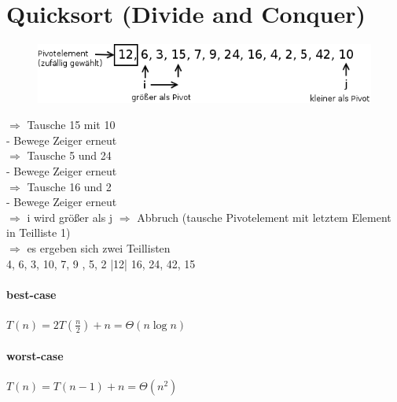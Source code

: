 \section{Quicksort (Divide and Conquer)}

\begin{figure}[h]
\includegraphics[width=0.6\linewidth]{5/Grafik/img1.png}
\end{figure}

$\Rightarrow $ Tausche 15 mit 10 \\
- Bewege Zeiger erneut \\
$\Rightarrow $ Tausche 5 und 24 \\
- Bewege Zeiger erneut \\
$\Rightarrow $ Tausche 16 und 2 \\
- Bewege Zeiger erneut \\
$\Rightarrow $ i wird größer als j $\Rightarrow $  Abbruch (tausche Pivotelement mit letztem Element in Teilliste 1) \\
$\Rightarrow $ es ergeben sich zwei Teillisten \\

4, 6, 3, 10, 7, 9 , 5, 2 |12| 16, 24, 42, 15 \\

\paragraph{best-case}  $T(n) = 2 T(\frac{n}{2}) + n = \Theta(n \log n) $

\paragraph{worst-case}  $T(n) = T(n-1) + n = \Theta(n^2) $
